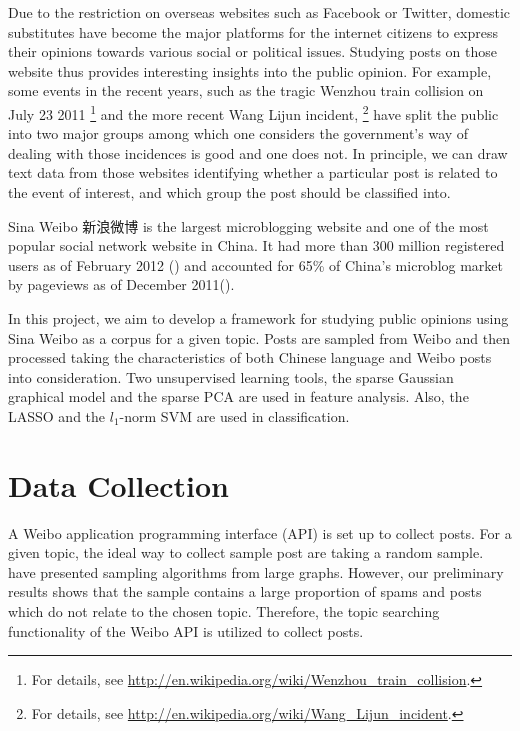 \documentclass[11pt]{article}
\newcommand{\1}[1]{{\mathbf 1}\left\{#1\right\}}        %
\begin{document}
Due to the restriction on overseas websites such as Facebook or Twitter, domestic substitutes have become the major platforms for the internet citizens to express their opinions towards various social or political issues. Studying posts on those website thus provides interesting insights into the public opinion. For example, some events in the recent years, such as the tragic Wenzhou train collision on July 23 2011
\footnote{For details, see \url{http://en.wikipedia.org/wiki/Wenzhou_train_collision}. }
  and the more recent Wang Lijun incident,
\footnote{For details, see \url{http://en.wikipedia.org/wiki/Wang_Lijun_incident}.}  
have split the public into two major groups among which one considers the government's way of dealing with those incidences is good and one does not. 
In principle, we can draw text data from those websites identifying whether a particular post is related to the event of interest, and which group the post should be classified into.

Sina Weibo 新浪微博 is the largest microblogging website and one of the most popular social network website in China. It had more than 300 million registered users as of February 2012 (\cite{bloombergSina})
and accounted for 65\% of China's microblog market by pageviews as of December 2011(\cite{WashingtonPostSina}).

In this project, we aim to develop a framework for studying public opinions using Sina Weibo as a corpus for a given topic. Posts are sampled from Weibo and then processed taking the characteristics of both Chinese language and Weibo posts into consideration. Two unsupervised learning tools, the sparse Gaussian graphical model and the sparse PCA are used in feature analysis. Also, the LASSO and the $l_1$-norm SVM are used in classification. 






\section{Data Collection}\label{subsec:datacol}

A Weibo  application programming interface (API) is set up to collect posts.
For a given topic, the ideal way to collect sample post are taking a random sample. \cite{boyd2004fastest, leskovec2006sampling, wang2011understanding} have presented sampling algorithms from large graphs. However, our preliminary results shows that the sample contains a large proportion of spams and posts which do not relate to the chosen topic. Therefore, the topic searching functionality of the Weibo API is utilized to collect posts. 
\end{document}
